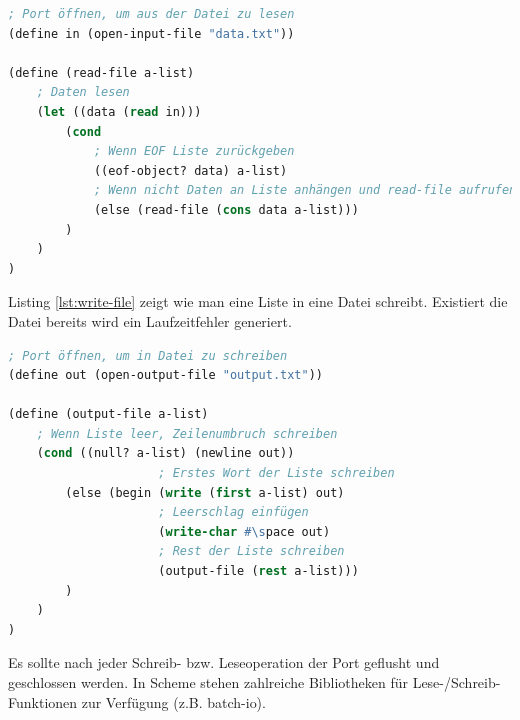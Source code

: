 \begin{lstlisting}[language=Lisp, caption=Datei lesen, label=lst:read-file]
; Port öffnen, um aus der Datei zu lesen
(define in (open-input-file "data.txt"))

(define (read-file a-list)
	; Daten lesen
	(let ((data (read in)))
		(cond
			; Wenn EOF Liste zurückgeben
			((eof-object? data) a-list)
			; Wenn nicht Daten an Liste anhängen und read-file aufrufen
			(else (read-file (cons data a-list)))
		)
	)
)
\end{lstlisting}

Listing \ref{lst:write-file} zeigt wie man eine Liste in eine Datei schreibt. Existiert die Datei bereits wird ein Laufzeitfehler generiert.

\begin{lstlisting}[language=Lisp, caption=Datei schreiben, label=lst:write-file]
; Port öffnen, um in Datei zu schreiben
(define out (open-output-file "output.txt"))

(define (output-file a-list)
	; Wenn Liste leer, Zeilenumbruch schreiben
	(cond ((null? a-list) (newline out))
					 ; Erstes Wort der Liste schreiben
		(else (begin (write (first a-list) out)
					 ; Leerschlag einfügen
					 (write-char #\space out)
					 ; Rest der Liste schreiben
					 (output-file (rest a-list)))
		)
	)
)
\end{lstlisting}

Es sollte nach jeder Schreib- bzw. Leseoperation der Port geflusht und geschlossen werden. In Scheme stehen zahlreiche Bibliotheken für Lese-/Schreib-Funktionen zur Verfügung (z.B. batch-io).